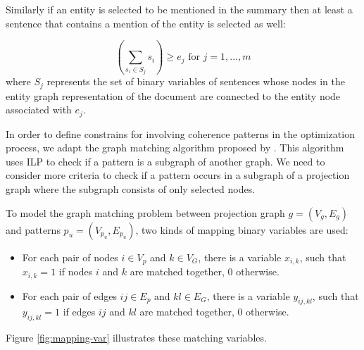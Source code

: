 Similarly if an entity is selected to be mentioned in the summary then at least a sentence that contains a mention of the entity is selected as well:   

\begin{equation}
(\sum_{s_i \in S_j}{s_i}) \ge e_j\text{ for }j = 1,...,m
\end{equation}
where $S_j$ represents the set of binary variables of sentences whose nodes in the entity graph representation of the document are connected to the entity node associated with $e_j$.  

In order to define constrains for involving coherence patterns in the optimization process, we adapt the graph matching algorithm proposed by .
This algorithm uses ILP to check if a pattern is a subgraph of another graph. 
We need to consider more criteria to check if a pattern occurs in a subgraph of a projection graph where the subgraph consists of only selected nodes. 

To model the graph matching problem between projection graph $g=(V_{g},E_{g})$ and patterns $p_{u}=(V_{p_{u}},E_{p_{u}})$, two kinds of mapping binary variables are used: 

\begin{itemize}

	\item 
	For each pair of nodes $i \in V_{p}$ and $k \in V_G$, there is a variable $x_{i,k}$, such that $x_{i,k} = 1$ if nodes $i$ and $k$ are matched together, $0$ otherwise. 

	\item For each pair of edges $ij \in E_{p}$ and $kl \in E_G$, there is a variable $y_{ij,kl}$, such that $y_{ij,kl} = 1$ if edges $ij$ and $kl$ are matched together, $0$ otherwise.

\end{itemize}

Figure \ref{fig:mapping-var} illustrates these matching variables. 

